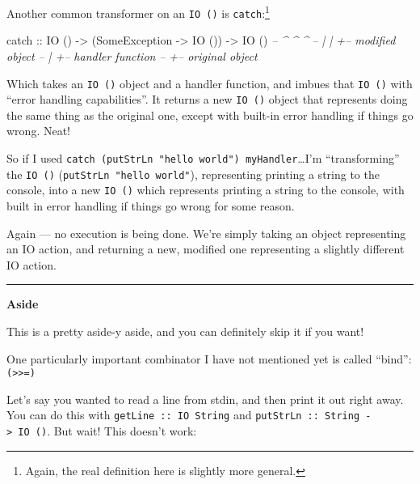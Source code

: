 \documentclass[]{article}
\newenvironment{Shaded}{}{}
\newcommand{\CommentTok}[1]{\textcolor[rgb]{0.38,0.63,0.69}{\textit{#1}}}
\newcommand{\DataTypeTok}[1]{\textcolor[rgb]{0.56,0.13,0.00}{#1}}
\newcommand{\NormalTok}[1]{#1}
\newcommand{\OtherTok}[1]{\textcolor[rgb]{0.00,0.44,0.13}{#1}}
\begin{document}
Another common transformer on an \texttt{IO\ ()} is \texttt{catch}:\footnote{Again,
  the real definition here is slightly more general.}

\begin{Shaded}
\begin{Highlighting}[]
\NormalTok{catch}\OtherTok{ ::} \DataTypeTok{IO}\NormalTok{ () }\OtherTok{->}\NormalTok{ (}\DataTypeTok{SomeException} \OtherTok{->} \DataTypeTok{IO}\NormalTok{ ()) }\OtherTok{->} \DataTypeTok{IO}\NormalTok{ ()}
\CommentTok{--       ^         ^                          ^}
\CommentTok{--       |         |                          +-- modified object}
\CommentTok{--       |         +-- handler function}
\CommentTok{--       +-- original object}
\end{Highlighting}
\end{Shaded}

Which takes an \texttt{IO\ ()} object and a handler function, and imbues that
\texttt{IO\ ()} with ``error handling capabilities''. It returns a new
\texttt{IO\ ()} object that represents doing the same thing as the original one,
except with built-in error handling if things go wrong. Neat!

So if I used \texttt{catch\ (putStrLn\ "hello\ world")\ myHandler}\ldots{}I'm
``transforming'' the \texttt{IO\ ()} (\texttt{putStrLn\ "hello\ world"}),
representing printing a string to the console, into a new \texttt{IO\ ()} which
represents printing a string to the console, with built in error handling if
things go wrong for some reason.

Again --- no execution is being done. We're simply taking an object representing
an IO action, and returning a new, modified one representing a slightly
different IO action.

\begin{center}\rule{0.5\linewidth}{\linethickness}\end{center}

\textbf{Aside}

This is a pretty aside-y aside, and you can definitely skip it if you want!

One particularly important combinator I have not mentioned yet is called
``bind'': \texttt{(\textgreater{}\textgreater{}=)}

Let's say you wanted to read a line from stdin, and then print it out right
away. You can do this with \texttt{getLine\ ::\ IO\ String} and
\texttt{putStrLn\ ::\ String\ -\textgreater{}\ IO\ ()}. But wait! This doesn't
work:
\end{document}
